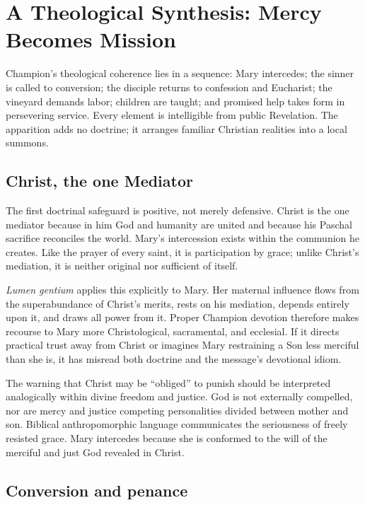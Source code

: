 \section{A Theological Synthesis: Mercy Becomes Mission}

Champion's theological coherence lies in a sequence: Mary intercedes; the sinner is called to conversion; the disciple returns to confession and Eucharist; the vineyard demands labor; children are taught; and promised help takes form in persevering service. Every element is intelligible from public Revelation. The apparition adds no doctrine; it arranges familiar Christian realities into a local summons.

\subsection{Christ, the one Mediator}

The first doctrinal safeguard is positive, not merely defensive. Christ is the one mediator because in him God and humanity are united and because his Paschal sacrifice reconciles the world. Mary's intercession exists within the communion he creates. Like the prayer of every saint, it is participation by grace; unlike Christ's mediation, it is neither original nor sufficient of itself.

\emph{Lumen gentium} applies this explicitly to Mary. Her maternal influence flows from the superabundance of Christ's merits, rests on his mediation, depends entirely upon it, and draws all power from it. Proper Champion devotion therefore makes recourse to Mary more Christological, sacramental, and ecclesial. If it directs practical trust away from Christ or imagines Mary restraining a Son less merciful than she is, it has misread both doctrine and the message's devotional idiom.

The warning that Christ may be “obliged” to punish should be interpreted analogically within divine freedom and justice. God is not externally compelled, nor are mercy and justice competing personalities divided between mother and son. Biblical anthropomorphic language communicates the seriousness of freely resisted grace. Mary intercedes because she is conformed to the will of the merciful and just God revealed in Christ.

\subsection{Conversion and penance}

